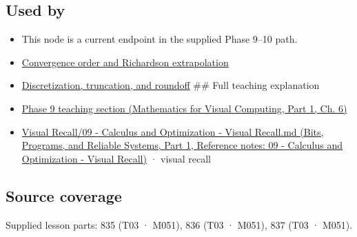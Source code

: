 \subsection{Used by}\label{appendix-80521eae6b71-used-by}

\hypertarget{appendix-80521eae6b71-used-by}{}

\begin{itemize}
\item
  This node is a current endpoint in the supplied Phase 9--10 path.
\item
  \hyperref[appendix-aca80b6bf17a]{Convergence order and Richardson extrapolation}
\item
  \hyperref[appendix-6b0648b2b8e8]{Discretization, truncation, and roundoff} \#\# Full teaching explanation
\item
  \href{../02-Mathematics-for-Visual-Computing-P01/main.pdf\#nameddest=02-foundations-ii-ch022-integration-and-quadrature}{Phase 9 teaching section (Mathematics for Visual Computing, Part 1, Ch. 6)}
\item
  \href{../01-Bits-Programs-and-Reliable-Systems-P01/main.pdf\#nameddest=appendix-adf48f5dc5c1}{Visual Recall/09 - Calculus and Optimization - Visual Recall.md (Bits, Programs, and Reliable Systems, Part 1, Reference notes: 09 - Calculus and Optimization - Visual Recall)} · visual recall
\end{itemize}

\subsection{Source coverage}\label{appendix-80521eae6b71-source-coverage}

\hypertarget{appendix-80521eae6b71-source-coverage}{}

Supplied lesson parts: 835 (T03 · M051), 836 (T03 · M051), 837 (T03 · M051).
